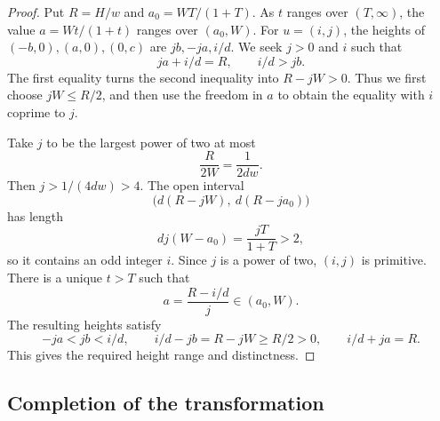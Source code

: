 \begin{proof}
Put $R=H/w$ and $a_0=WT/(1+T)$.  As $t$ ranges over $(T,\infty)$, the value $a=Wt/(1+t)$ ranges over $(a_0,W)$. For $u=(i,j)$, the heights of $(-b,0),(a,0),(0,c)$ are $jb,-ja,i/d$. We seek $j>0$ and $i$ such that
\[
 ja+i/d=R,\qquad i/d>jb.
\]
The first equality turns the second inequality into $R-jW>0$. Thus we first choose $jW\le R/2$, and then use the freedom in $a$ to obtain the equality with $i$ coprime to $j$.

Take $j$ to be the largest power of two at most
\[
 \frac{R}{2W}=\frac{1}{2dw}.
\]
Then $j>1/(4dw)>4$.  The open interval
\[
 \bigl(d(R-jW),\ d(R-ja_0)\bigr)
\]
has length
\[
 dj(W-a_0)=\frac{jT}{1+T}>2,
\]
so it contains an odd integer $i$.  Since $j$ is a power of two, $(i,j)$ is primitive.  There is a unique $t>T$ such that
\[
 a=\frac{R-i/d}{j}\in(a_0,W).
\]
The resulting heights satisfy
\[
 -ja<jb<i/d,\qquad
 i/d-jb=R-jW\ge R/2>0,\qquad i/d+ja=R.
\]
This gives the required height range and distinctness.
\end{proof}

\subsection{Completion of the transformation}

